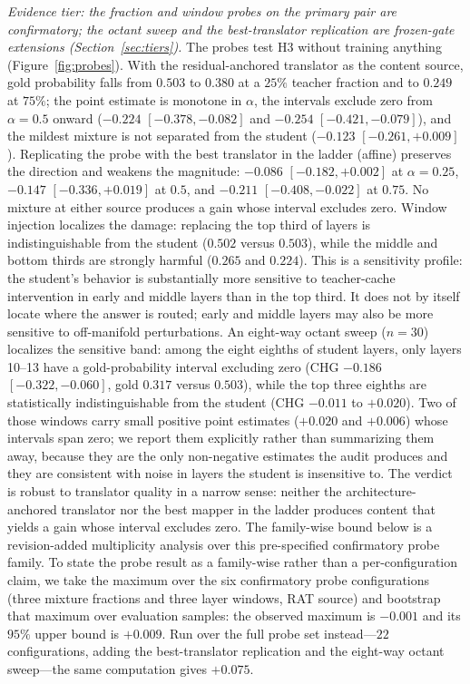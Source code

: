 \documentclass[10pt]{article}
\begin{document}
\emph{Evidence tier: the fraction and window probes on the primary pair are
confirmatory; the octant sweep and the best-translator replication are
frozen-gate extensions (Section~\ref{sec:tiers}).}
The probes test H3 without training anything (Figure~\ref{fig:probes}). With the
residual-anchored translator as the content source, gold probability falls from
$0.503$ to $0.380$ at a $25\%$ teacher fraction and to $0.249$ at $75\%$; the
point estimate is monotone in $\alpha$, the intervals exclude zero from
$\alpha{=}0.5$ onward ($-0.224$ $[-0.378, -0.082]$ and $-0.254$
$[-0.421, -0.079]$), and the mildest mixture is not separated from the student
($-0.123$ $[-0.261, +0.009]$). Replicating the probe with the best translator in
the ladder (affine) preserves the direction and weakens the magnitude: $-0.086$
$[-0.182, +0.002]$ at $\alpha{=}0.25$, $-0.147$ $[-0.336, +0.019]$ at $0.5$, and
$-0.211$ $[-0.408, -0.022]$ at $0.75$. No mixture at either source produces a
gain whose interval excludes zero. Window injection localizes the damage:
replacing the top third of layers is indistinguishable from the student
($0.502$ versus $0.503$), while the middle and bottom thirds are strongly
harmful ($0.265$ and $0.224$). This is a sensitivity profile: the student's
behavior is substantially more sensitive to teacher-cache intervention in
early and middle layers than in the top third. It does not by itself locate
where the answer is routed; early and middle layers may also be more sensitive
to off-manifold perturbations. An eight-way octant sweep ($n{=}30$)
localizes the sensitive band: among the eight eighths of student layers, only
layers 10--13 have a gold-probability interval excluding zero (CHG $-0.186$
$[-0.322, -0.060]$, gold $0.317$ versus $0.503$), while the top three eighths
are statistically indistinguishable from the student (CHG $-0.011$ to
$+0.020$). Two of those windows carry small positive point estimates
($+0.020$ and $+0.006$) whose intervals span zero; we report them explicitly
rather than summarizing them away, because they are the only non-negative
estimates the audit produces and they are consistent with noise in layers the
student is insensitive to. The verdict is robust to translator quality in a
narrow sense: neither the architecture-anchored translator nor the best mapper
in the ladder produces content that yields a gain whose interval excludes zero.
The family-wise bound below is a revision-added multiplicity analysis over this pre-specified
confirmatory probe family. To state the probe result as a family-wise rather than a per-configuration claim, we take
the maximum over the six confirmatory probe configurations (three mixture
fractions and three layer windows, RAT source) and bootstrap that maximum over
evaluation samples: the observed maximum is $-0.001$ and its $95\%$ upper bound
is $+0.009$. Run over the full probe set instead---$22$ configurations, adding the
best-translator replication and the eight-way octant sweep---the same
computation gives $+0.075$.
\end{document}

